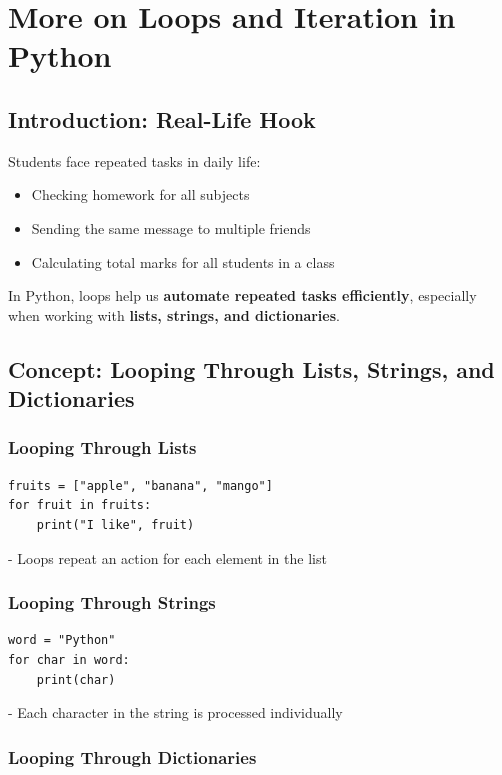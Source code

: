\chapter{More on Loops and Iteration in Python}

\section{Introduction: Real-Life Hook}

Students face repeated tasks in daily life:  

\begin{itemize}
    \item Checking homework for all subjects  
    \item Sending the same message to multiple friends  
    \item Calculating total marks for all students in a class  
\end{itemize}

In Python, loops help us \textbf{automate repeated tasks efficiently}, especially when working with \textbf{lists, strings, and dictionaries}.

\section{Concept: Looping Through Lists, Strings, and Dictionaries}

\subsection{Looping Through Lists}

\begin{verbatim}
fruits = ["apple", "banana", "mango"]
for fruit in fruits:
    print("I like", fruit)
\end{verbatim}

- Loops repeat an action for each element in the list  

\subsection{Looping Through Strings}

\begin{verbatim}
word = "Python"
for char in word:
    print(char)
\end{verbatim}

- Each character in the string is processed individually  

\subsection{Looping Through Dictionaries}

